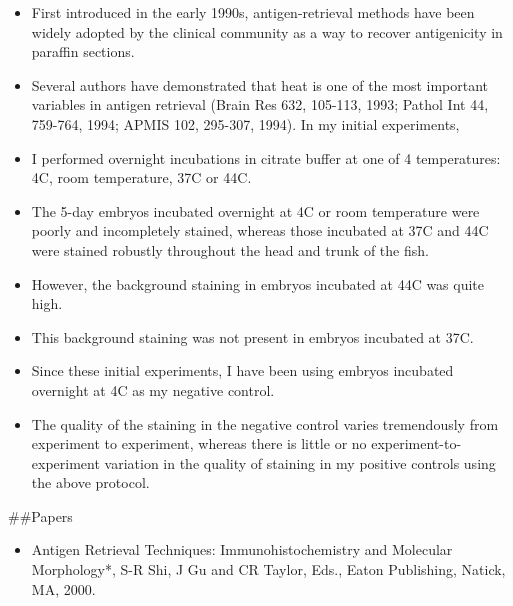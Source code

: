 \documentclass[
  letterpaper,
  DIV=11,
  numbers=noendperiod]{scrreprt}
\providecommand{\tightlist}{%
  \setlength{\itemsep}{0pt}\setlength{\parskip}{0pt}}\usepackage{longtable,booktabs,array}
\begin{document}
\begin{tcolorbox}[enhanced jigsaw, rightrule=.15mm, title=\textcolor{quarto-callout-note-color}{\faInfo}\hspace{0.5em}{Modified Antigen Retrieva}, titlerule=0mm, opacitybacktitle=0.6, toprule=.15mm, bottomrule=.15mm, opacityback=0, left=2mm, colframe=quarto-callout-note-color-frame, breakable, coltitle=black, colback=white, colbacktitle=quarto-callout-note-color!10!white, bottomtitle=1mm, leftrule=.75mm, toptitle=1mm, arc=.35mm]

\begin{itemize}
\tightlist
\item
  First introduced in the early 1990s, antigen-retrieval methods have
  been widely adopted by the clinical community as a way to recover
  antigenicity in paraffin sections.
\item
  Several authors have demonstrated that heat is one of the most
  important variables in antigen retrieval (Brain Res 632, 105-113,
  1993; Pathol Int 44, 759-764, 1994; APMIS 102, 295-307, 1994). In my
  initial experiments,
\item
  I performed overnight incubations in citrate buffer at one of 4
  temperatures: 4C, room temperature, 37C or 44C.
\item
  The 5-day embryos incubated overnight at 4C or room temperature were
  poorly and incompletely stained, whereas those incubated at 37C and
  44C were stained robustly throughout the head and trunk of the fish.
\item
  However, the background staining in embryos incubated at 44C was quite
  high.
\item
  This background staining was not present in embryos incubated at 37C.
\item
  Since these initial experiments, I have been using embryos incubated
  overnight at 4C as my negative control.
\item
  The quality of the staining in the negative control varies
  tremendously from experiment to experiment, whereas there is little or
  no experiment-to-experiment variation in the quality of staining in my
  positive controls using the above protocol.
\end{itemize}

\end{tcolorbox}

\#\#Papers

\begin{itemize}
\tightlist
\item
  Antigen Retrieval Techniques: Immunohistochemistry and Molecular
  Morphology*, S-R Shi, J Gu and CR Taylor, Eds., Eaton Publishing,
  Natick, MA, 2000.
\end{itemize}
\end{document}
